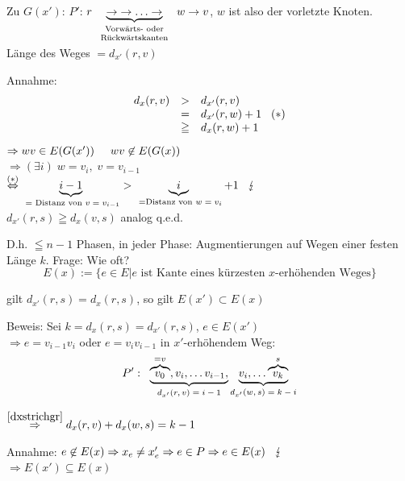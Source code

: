 Zu $G(x')$: $P'$: $r\underbrace{\rightarrow \; \rightarrow \ldots
\rightarrow}_{\mbox{\scriptsize \begin{tabular}{c}Vorwärts- oder\\
Rückwärtskanten\end{tabular}}}w\rightarrow v$, $w$ ist also der vorletzte Knoten.\\
Länge des Weges $= d_{x'}(r,v)$

Annahme:
\[\begin{array}{rcl}d_{x}(r,v) &>& d_{x'}(r,v)\\
&=&d_{x'}(r,w) + 1 \hspace{3mm} (\ast)\\
&\geqq& d_{x} (r,w) +1 \end{array}\]
$\Rightarrow w v \in E (G(x')) \hspace{5mm} w v \not \in E(G(x))$\\
$\Rightarrow (\exists i ) \; w = v_{i}, \; v=v_{i -1}$\\
$\stackrel{\mbox{\scriptsize$(\ast)$}}{\Leftrightarrow} 
\underbrace{i -1}_{\mbox{
\scriptsize$=$ Distanz von $v=v_{i-1}$}} > \underbrace{i}_{\mbox{
\scriptsize$=$Distanz von $w=v_{i}$}}+1\hspace{3mm}\lightning$\\
$d_{x'}(r,s) \geqq d_{x}(v,s)$ analog q.e.d.

D.h. $\leqq n-1$ Phasen, in jeder Phase: Augmentierungen auf Wegen einer
festen Länge $k$. Frage: Wie oft?
\[E(x):= \{e \in E | e \mbox{ ist Kante eines kürzesten $x$-erhöhenden 
Weges}\}\]

\begin{lemma}\label{KWgroe}
gilt $d_{x'}(r,s) = d_{x}(r,s)$, so gilt $E(x') \subset E(x)$
\end{lemma}
Beweis: Sei $k=d_{x}(r,s) = d_{x'}(r,s)$, $e \in E(x')$\\
$\Rightarrow e = v_{i-1}v_{i}$ oder $e=v_{i}v_{i-1}$ in $x'$-erhöhendem
Weg:
\[P': \; \; \underbrace{\overbrace{v_{0}}^{=v},v_{i},\ldots v_{i-1},}_{
\mbox{\scriptsize$
d_{x'}(r,v)=i-1$}}
\underbrace{v_{i}, \ldots \overbrace{v_{k}}^{s}}_{\mbox{\scriptsize$
d_{x'}(w,s) = k-i$}}\]

$\stackrel{\ref{dxstrichgr}}{\Rightarrow} d_{x}(r,v) + d_{x}(w,s)=k-1$ 

Annahme: $e \not\in E(x) \Rightarrow x_{e} \not= x'_{e} \Rightarrow e \in P
\Rightarrow e \in E(x) \hspace{3mm} \lightning$\\
$\Rightarrow E(x') \subseteq E(x)$

